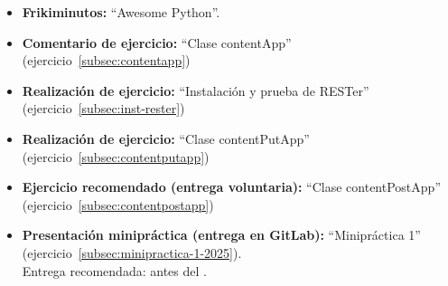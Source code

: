 \documentclass[a4paper,12pt]{article}
\begin{document}
\begin{itemize}
\item \textbf{Frikiminutos:} ``Awesome Python''.
\item \textbf{Comentario de ejercicio:}  ``Clase contentApp'' (ejercicio~\ref{subsec:contentapp})
\item \textbf{Realización de ejercicio:}  ``Instalación y prueba de RESTer'' (ejercicio~\ref{subsec:inst-rester})
\item \textbf{Realización de ejercicio:}  ``Clase contentPutApp'' (ejercicio~\ref{subsec:contentputapp})
\item \textbf{Ejercicio recomendado (entrega voluntaria):} ``Clase contentPostApp'' (ejercicio~\ref{subsec:contentpostapp})
\item \textbf{Presentación minipráctica (entrega en GitLab):} ``Minipráctica 1'' (ejercicio~\ref{subsec:minipractica-1-2025}). \\
    Entrega recomendada: antes del \juevesH.
\end{itemize}



\end{document}
